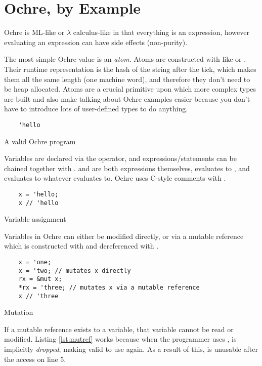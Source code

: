 \documentclass[12pt,twoside]{report}
\begin{document}
\section{Ochre, by Example}
Ochre is ML-like or $\lambda$ calculus-like in that everything is an expression, however evaluating an expression can have side effects (non-purity).

The most simple Ochre value is an \textit{atom}. Atoms are constructed with  like  or . Their runtime representation is the hash of the string after the tick, which makes them all the same length (one machine word), and therefore they don't need to be heap allocated. Atoms are a crucial primitive upon which more complex types are built and also make talking about Ochre examples easier because you don't have to introduce lots of user-defined types to do anything.
  
\begin{listing}[H]
  \begin{verbatim}
    'hello
  \end{verbatim}
  \caption{A valid Ochre program}
\end{listing}

Variables are declared via the \mono{=} operator, and expressions/statements can be chained together with \mono{;}.  and  are both expressions themselves,  evaluates to , and  evaluates to whatever  evaluates to. Ochre uses C-style comments with \mono{//}.

\begin{listing}[H]
  \begin{verbatim}
    x = 'hello;
    x // 'hello
  \end{verbatim}
  \caption{Variable assignment}
\end{listing}

Variables in Ochre can either be modified directly, or via a mutable reference which is constructed with  and dereferenced with \mono{*}.

\begin{listing}[H]
  \begin{verbatim}
    x = 'one;
    x = 'two; // mutates x directly
    rx = &mut x;
    *rx = 'three; // mutates x via a mutable reference
    x // 'three
  \end{verbatim}
  \caption{Mutation}
  \label{lst:mutref}
\end{listing}

If a mutable reference exists to a variable, that variable cannot be read or modified. Listing \ref{lst:mutref} works because when the programmer uses ,  is implicitly \textit{dropped}, making  valid to use again. As a result of this,  is unusable after the  access on line 5.
\end{document}
